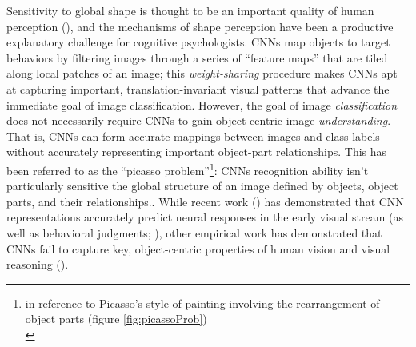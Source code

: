 \documentclass[12pt]{article}
\let\oldcite=\cite
\renewcommand{\cite}[1]{\textcolor[rgb]{0, .121, .388}{\oldcite{#1}}}
\begin{document}
Sensitivity to global shape is thought to be an important quality of human perception (\cite{biederman1987recognition,tanaka1996inferotemporal,hummel1992dynamic,biederman1993recognizing}), and the mechanisms of shape perception have been a productive explanatory challenge for cognitive psychologists. CNNs map objects to target behaviors by filtering images through a series of ``feature maps'' that are tiled along local patches of an image; this \emph{weight-sharing} procedure makes CNNs apt at capturing important, translation-invariant visual patterns that advance the immediate goal of image classification. However, the goal of image \emph{classification} does not necessarily require CNNs to gain object-centric image \emph{understanding}. That is, CNNs can form accurate mappings between images and class labels without accurately representing important object-part relationships. This has been referred to as the ``picasso problem''\footnote{in reference to Picasso's style of painting involving the rearrangement of object parts (figure \ref{fig:picassoProb}) \\}: CNNs recognition ability isn't particularly sensitive the global structure of an image defined by objects, object parts, and their relationships.. While recent work (\cite{yamins2014performance,kietzmann2018deep}) has demonstrated that CNN representations accurately predict neural responses in the early visual stream (as well as behavioral judgments; \cite{peterson2016adapting,lake2015deep,kummerer2014deep}), other empirical work has demonstrated that CNNs fail to capture key, object-centric properties of human vision and visual reasoning (\cite{pramod2016computational,erdogan2017visual,baker2018deep}).
\end{document}
